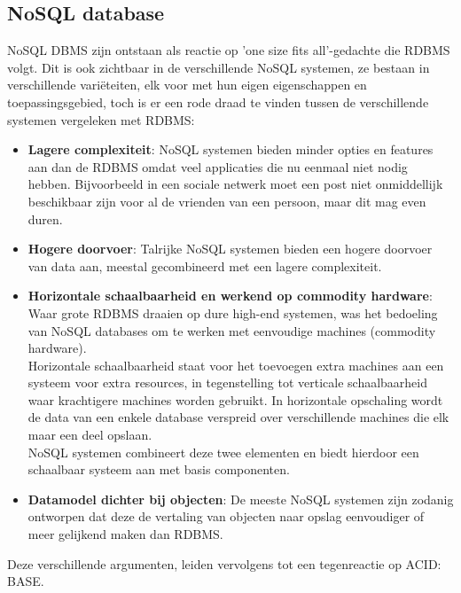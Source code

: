 \subsection{NoSQL database}\label{sec:eventualconsistency}
NoSQL DBMS zijn ontstaan als reactie op 'one size fits all'-gedachte die RDBMS volgt. Dit is ook zichtbaar in de verschillende NoSQL systemen, ze bestaan in verschillende variëteiten, elk voor met hun eigen eigenschappen en toepassingsgebied, toch is er een rode draad te vinden tussen de verschillende systemen vergeleken met RDBMS: 
\begin{itemize}
	\item \textbf{Lagere complexiteit}: NoSQL systemen bieden minder opties en features aan dan de RDBMS omdat veel applicaties die nu eenmaal niet nodig hebben. Bijvoorbeeld in een sociale netwerk moet een post niet onmiddellijk beschikbaar zijn voor al de vrienden van een persoon, maar dit mag even duren.
	\item \textbf{Hogere doorvoer}: Talrijke NoSQL systemen bieden een hogere doorvoer van data aan, meestal gecombineerd met een lagere complexiteit. 
	\item \textbf{Horizontale schaalbaarheid en werkend op commodity hardware}: Waar grote RDBMS draaien op dure high-end systemen, was het bedoeling van NoSQL databases om te werken met eenvoudige machines (commodity hardware). \\
	Horizontale schaalbaarheid staat voor het toevoegen extra machines aan een systeem voor extra resources, in tegenstelling tot verticale schaalbaarheid waar krachtigere machines worden gebruikt. In horizontale opschaling wordt de data van een enkele database verspreid over verschillende machines die elk maar een deel opslaan.\\
	NoSQL systemen combineert deze twee elementen en biedt hierdoor een schaalbaar systeem aan met basis componenten.
	\item \textbf{Datamodel dichter bij objecten}: De meeste NoSQL systemen zijn zodanig ontworpen dat deze de vertaling van objecten naar opslag eenvoudiger of meer gelijkend maken dan RDBMS.  
\end{itemize}  \noindent
Deze verschillende argumenten, leiden vervolgens tot een tegenreactie op ACID: BASE. \noindent
